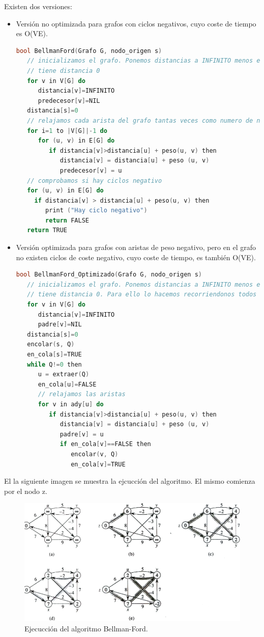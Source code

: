 Existen dos versiones:
\begin{itemize}
	\item Versión no optimizada para grafos con ciclos negativos, cuyo coste de tiempo es O(VE).
	\begin{lstlisting}[language=C++]
bool BellmanFord(Grafo G, nodo_origen s)
   // inicializamos el grafo. Ponemos distancias a INFINITO menos el nodo origen que 
   // tiene distancia 0
   for v in V[G] do
      distancia[v]=INFINITO
      predecesor[v]=NIL
   distancia[s]=0
   // relajamos cada arista del grafo tantas veces como numero de nodos -1 haya en el grafo
   for i=1 to |V[G]|-1 do
      for (u, v) in E[G] do
         if distancia[v]>distancia[u] + peso(u, v) then
            distancia[v] = distancia[u] + peso (u, v)
            predecesor[v] = u
   // comprobamos si hay ciclos negativo
   for (u, v) in E[G] do
     if distancia[v] > distancia[u] + peso(u, v) then
		print ("Hay ciclo negativo")
		return FALSE
   return TRUE
	\end{lstlisting} 
	\item Versión optimizada para grafos con aristas de peso negativo, pero en el grafo no existen 
	ciclos de coste negativo, cuyo coste de tiempo, es también O(VE). 
	\begin{lstlisting}[language=C++]
bool BellmanFord_Optimizado(Grafo G, nodo_origen s)
   // inicializamos el grafo. Ponemos distancias a INFINITO menos el nodo origen que
   // tiene distancia 0. Para ello lo hacemos recorriendonos todos los vertices del grafo
   for v in V[G] do
      distancia[v]=INFINITO
      padre[v]=NIL
   distancia[s]=0
   encolar(s, Q)
   en_cola[s]=TRUE
   while Q!=0 then
      u = extraer(Q)
      en_cola[u]=FALSE
      // relajamos las aristas
      for v in ady[u] do
         if distancia[v]>distancia[u] + peso(u, v) then
            distancia[v] = distancia[u] + peso (u, v)
            padre[v] = u
            if en_cola[v]==FALSE then
               encolar(v, Q)
               en_cola[v]=TRUE
	\end{lstlisting} 
\end{itemize}

El la siguiente imagen se muestra la ejcucción del algoritmo. El mismo comienza por el nodo z.

\begin{figure}[h]
	\centering 
	\includegraphics[scale=0.53]{img/bellman-ford}
	\caption{Ejecucción del algoritmo Bellman-Ford.}
	\label{contexto:figura6}
\end{figure}


